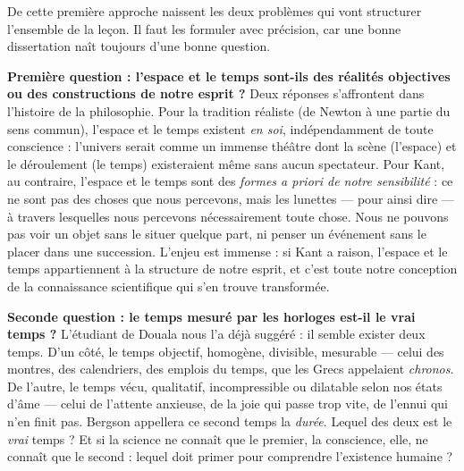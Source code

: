 \documentclass[11pt]{article}
\newcounter{popsec}
\newcounter{popsub}
\newcommand{\courssub}[1]{%
  \stepcounter{popsub}%
  \par\vspace{9pt}\noindent{\popxbold\fontsize{11.5}{13}\selectfont\color{popink}{\color{poporange}\thepopsec.\thepopsub}\hspace{6pt}#1}\par\nopagebreak\vspace{4pt}
}
\begin{document}
\courssub{Deux grandes questions directrices}

De cette première approche naissent les deux problèmes qui vont structurer l'ensemble de la leçon. Il faut les formuler avec précision, car une bonne dissertation naît toujours d'une bonne question.

\textbf{Première question : l'espace et le temps sont-ils des réalités objectives ou des constructions de notre esprit ?} Deux réponses s'affrontent dans l'histoire de la philosophie. Pour la tradition réaliste (de Newton à une partie du sens commun), l'espace et le temps existent \emph{en soi}, indépendamment de toute conscience : l'univers serait comme un immense théâtre dont la scène (l'espace) et le déroulement (le temps) existeraient même sans aucun spectateur. Pour Kant, au contraire, l'espace et le temps sont des \emph{formes a priori de notre sensibilité} : ce ne sont pas des choses que nous percevons, mais les lunettes — pour ainsi dire — à travers lesquelles nous percevons nécessairement toute chose. Nous ne pouvons pas voir un objet sans le situer quelque part, ni penser un événement sans le placer dans une succession. L'enjeu est immense : si Kant a raison, l'espace et le temps appartiennent à la structure de notre esprit, et c'est toute notre conception de la connaissance scientifique qui s'en trouve transformée.

\textbf{Seconde question : le temps mesuré par les horloges est-il le vrai temps ?} L'étudiant de Douala nous l'a déjà suggéré : il semble exister deux temps. D'un côté, le temps objectif, homogène, divisible, mesurable — celui des montres, des calendriers, des emplois du temps, que les Grecs appelaient \emph{chronos}. De l'autre, le temps vécu, qualitatif, incompressible ou dilatable selon nos états d'âme — celui de l'attente anxieuse, de la joie qui passe trop vite, de l'ennui qui n'en finit pas. Bergson appellera ce second temps la \emph{durée}. Lequel des deux est le \emph{vrai} temps ? Et si la science ne connaît que le premier, la conscience, elle, ne connaît que le second : lequel doit primer pour comprendre l'existence humaine ?
\end{document}
